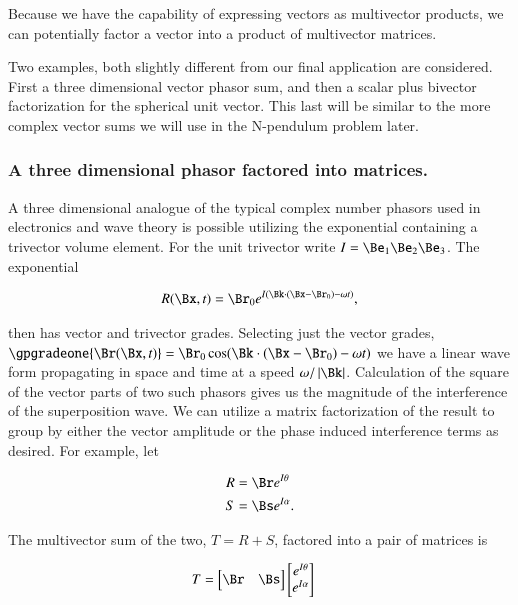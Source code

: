 Because we have the capability of expressing vectors as multivector products, we can potentially factor a vector into a product of multivector matrices.

Two examples, both slightly different from our final application are considered.  First a three dimensional vector phasor sum, and then a scalar plus bivector factorization for the spherical unit vector.  This last will be similar to the more complex vector sums we will use in the N-pendulum problem later.

\subsubsection{A three dimensional phasor factored into matrices.}

A three dimensional analogue of the typical complex number phasors used in electronics and wave theory is possible utilizing the exponential containing a trivector volume element.  For the unit trivector write $I = \Be_1 \Be_2 \Be_3$.  The exponential

\begin{align}\label{eqn:gaMintro:mp110}
R(\Bx, t) = \Br_0 e^{I(\Bk \cdot (\Bx - \Br_0) - \omega t)},
\end{align}

then has vector and trivector grades.  Selecting just the vector grades, $\gpgradeone{\Br(\Bx, t)} = \Br_0 \cos(\Bk \cdot (\Bx - \Br_0) - \omega t)$ we have a linear wave form propagating in space and time at a speed $\omega/\Abs{\Bk}$.  Calculation of the square of the vector parts of two such phasors gives us the magnitude of the interference of the superposition wave.  We can utilize a matrix factorization of the result to group by either the vector amplitude or the phase induced interference terms as desired.  For example, let

\begin{align}\label{eqn:gaMintro:mp120}
R &= \Br e^{I\theta} \\
S &= \Bs e^{I\alpha}.
\end{align}

The multivector sum of the two, $T = R + S$, factored into a pair of matrices is

\begin{align}\label{eqn:gaMintro:mp130}
T &=
\begin{bmatrix}
\Br & \Bs 
\end{bmatrix}
\begin{bmatrix}
e^{I\theta} \\
e^{I\alpha}
\end{bmatrix}
\end{align}

